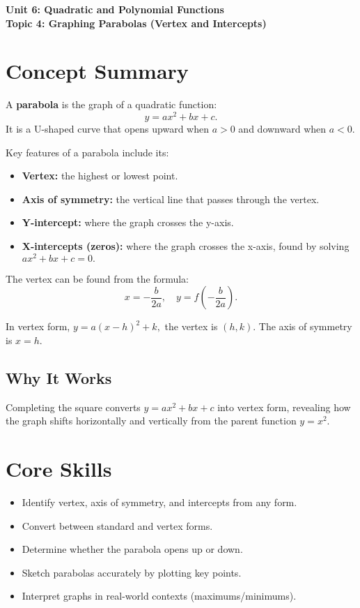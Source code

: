 \documentclass[12pt]{article}
\begin{document}
\begin{center}
    \LARGE \textbf{Unit 6: Quadratic and Polynomial Functions} \\[6pt]
    \Large \textbf{Topic 4: Graphing Parabolas (Vertex and Intercepts)}
\end{center}

\vspace{1em}

\section*{Concept Summary}

A \textbf{parabola} is the graph of a quadratic function:
\[
y = ax^2 + bx + c.
\]
It is a U-shaped curve that opens upward when \(a > 0\) and downward when \(a < 0.\)

Key features of a parabola include its:
\begin{itemize}
  \item \textbf{Vertex:} the highest or lowest point.
  \item \textbf{Axis of symmetry:} the vertical line that passes through the vertex.
  \item \textbf{Y-intercept:} where the graph crosses the y-axis.
  \item \textbf{X-intercepts (zeros):} where the graph crosses the x-axis, found by solving \(ax^2 + bx + c = 0.\)
\end{itemize}

The vertex can be found from the formula:
\[
x = -\frac{b}{2a}, \quad y = f\!\left(-\frac{b}{2a}\right).
\]

In vertex form, \(y = a(x - h)^2 + k,\) the vertex is \((h, k)\).  
The axis of symmetry is \(x = h.\)

\subsection*{Why It Works}
Completing the square converts \(y = ax^2 + bx + c\) into vertex form, revealing how the graph shifts horizontally and vertically from the parent function \(y = x^2.\)

\section*{Core Skills}
\begin{itemize}
  \item Identify vertex, axis of symmetry, and intercepts from any form.
  \item Convert between standard and vertex forms.
  \item Determine whether the parabola opens up or down.
  \item Sketch parabolas accurately by plotting key points.
  \item Interpret graphs in real-world contexts (maximums/minimums).
\end{itemize}
\end{document}
